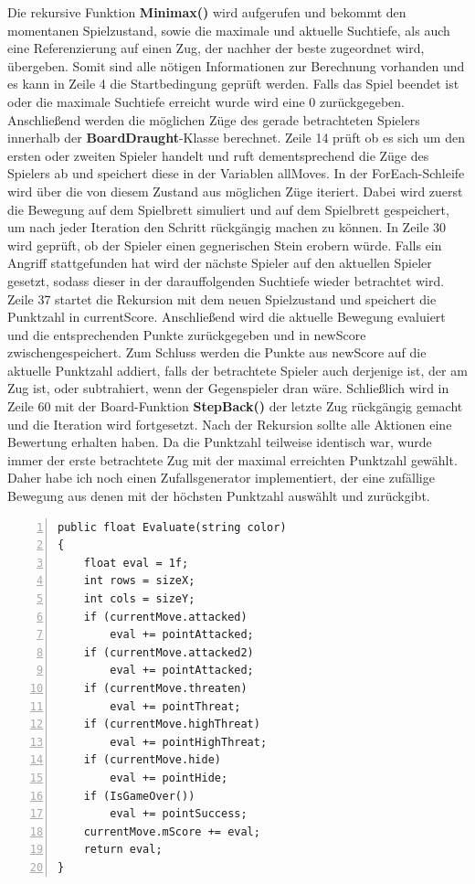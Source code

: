 Die rekursive Funktion \textbf{Minimax()} wird aufgerufen und bekommt den momentanen Spielzustand, sowie die maximale und aktuelle Suchtiefe, als auch eine Referenzierung auf einen Zug, der nachher der beste zugeordnet wird, übergeben. Somit sind alle nötigen Informationen zur Berechnung vorhanden und es kann in Zeile 4 die Startbedingung geprüft werden. Falls das Spiel beendet ist oder die maximale Suchtiefe erreicht wurde wird eine 0 zurückgegeben. Anschließend werden die möglichen Züge des gerade betrachteten Spielers innerhalb der \textbf{BoardDraught}-Klasse berechnet. Zeile 14 prüft ob es sich um den ersten oder zweiten Spieler handelt und ruft dementsprechend die Züge des Spielers ab und speichert diese in der Variablen allMoves. In der ForEach-Schleife wird über die von diesem Zustand aus möglichen Züge iteriert. Dabei wird zuerst die Bewegung auf dem Spielbrett simuliert und auf dem Spielbrett gespeichert, um nach jeder Iteration den Schritt rückgängig machen zu können. In Zeile 30 wird geprüft, ob der Spieler einen gegnerischen Stein erobern würde. Falls ein Angriff stattgefunden hat wird der nächste Spieler auf den aktuellen Spieler gesetzt, sodass dieser in der darauffolgenden Suchtiefe wieder betrachtet wird. Zeile 37 startet die Rekursion mit dem neuen Spielzustand und speichert die Punktzahl in currentScore. Anschließend wird die aktuelle Bewegung evaluiert und die entsprechenden Punkte zurückgegeben und in newScore zwischengespeichert. Zum Schluss werden die Punkte aus newScore auf die aktuelle Punktzahl addiert, falls der betrachtete Spieler auch derjenige ist, der am Zug ist, oder subtrahiert, wenn der Gegenspieler dran wäre. Schließlich wird in Zeile 60 mit der Board-Funktion \textbf{StepBack()} der letzte Zug rückgängig gemacht und die Iteration wird fortgesetzt. Nach der Rekursion sollte alle Aktionen eine Bewertung erhalten haben. Da die Punktzahl teilweise identisch war, wurde immer der erste betrachtete Zug mit der maximal erreichten Punktzahl gewählt. Daher habe ich noch einen Zufallsgenerator implementiert, der eine zufällige Bewegung aus denen mit der höchsten Punktzahl auswählt und zurückgibt.\\
\begin{lstlisting}[basicstyle=\scriptsize\ttfamily, numbers=left, stepnumber=1, numberstyle = \tiny]
public float Evaluate(string color)
{
	float eval = 1f;
	int rows = sizeX;
	int cols = sizeY;
	if (currentMove.attacked)
		eval += pointAttacked;
	if (currentMove.attacked2)
		eval += pointAttacked;
	if (currentMove.threaten)
		eval += pointThreat;
	if (currentMove.highThreat)
		eval += pointHighThreat;
	if (currentMove.hide)
		eval += pointHide;
	if (IsGameOver())
		eval += pointSuccess;
	currentMove.mScore += eval;
	return eval;
}
\end{lstlisting}

